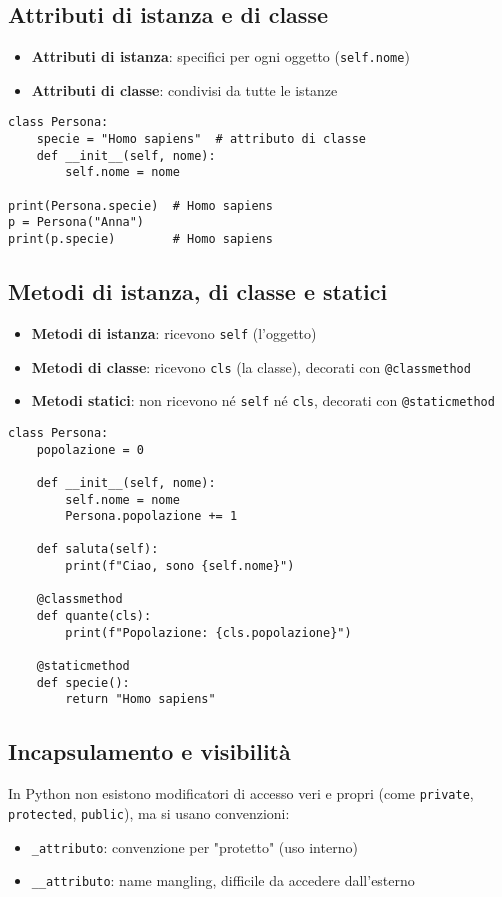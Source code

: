 \documentclass[a4paper,12pt]{article}
\begin{document}
\subsection*{Attributi di istanza e di classe}
\begin{itemize}
    \item \textbf{Attributi di istanza}: specifici per ogni oggetto (\texttt{self.nome})
    \item \textbf{Attributi di classe}: condivisi da tutte le istanze
\end{itemize}

\begin{lstlisting}
class Persona:
    specie = "Homo sapiens"  # attributo di classe
    def __init__(self, nome):
        self.nome = nome

print(Persona.specie)  # Homo sapiens
p = Persona("Anna")
print(p.specie)        # Homo sapiens
\end{lstlisting}

\subsection*{Metodi di istanza, di classe e statici}
\begin{itemize}
    \item \textbf{Metodi di istanza}: ricevono \texttt{self} (l'oggetto)
    \item \textbf{Metodi di classe}: ricevono \texttt{cls} (la classe), decorati con \texttt{@classmethod}
    \item \textbf{Metodi statici}: non ricevono né \texttt{self} né \texttt{cls}, decorati con \texttt{@staticmethod}
\end{itemize}

\begin{lstlisting}
class Persona:
    popolazione = 0

    def __init__(self, nome):
        self.nome = nome
        Persona.popolazione += 1

    def saluta(self):
        print(f"Ciao, sono {self.nome}")

    @classmethod
    def quante(cls):
        print(f"Popolazione: {cls.popolazione}")

    @staticmethod
    def specie():
        return "Homo sapiens"
\end{lstlisting}

\subsection*{Incapsulamento e visibilità}
In Python non esistono modificatori di accesso veri e propri (come \texttt{private}, \texttt{protected}, \texttt{public}), ma si usano convenzioni:
\begin{itemize}
    \item \texttt{\_attributo}: convenzione per "protetto" (uso interno)
    \item \texttt{\_\_attributo}: name mangling, difficile da accedere dall'esterno
\end{itemize}
\end{document}
